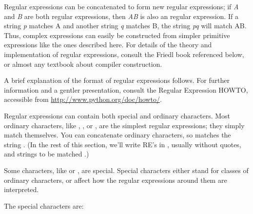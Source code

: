 Regular expressions can be concatenated to form new regular
expressions; if \emph{A} and \emph{B} are both regular expressions,
then \emph{AB} is also an regular expression.  If a string \emph{p}
matches A and another string \emph{q} matches B, the string \emph{pq}
will match AB.  Thus, complex expressions can easily be constructed
from simpler primitive expressions like the ones described here.  For
details of the theory and implementation of regular expressions,
consult the Friedl book referenced below, or almost any textbook about
compiler construction.

A brief explanation of the format of regular expressions follows.  For
further information and a gentler presentation, consult the Regular
Expression HOWTO, accessible from \url{http://www.python.org/doc/howto/}.

Regular expressions can contain both special and ordinary characters.
Most ordinary characters, like , , or ,
are the simplest regular expressions; they simply match themselves.  
You can concatenate ordinary characters, so  matches the
string .  (In the rest of this section, we'll write RE's in
, usually without quotes, and strings to be
matched .)

Some characters, like \character{|} or \character{(}, are special.  Special
characters either stand for classes of ordinary characters, or affect
how the regular expressions around them are interpreted.

The special characters are:

